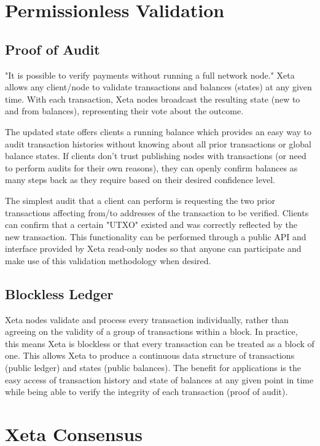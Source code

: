 \documentclass{article}
\begin{document}
\section{Permissionless Validation}
\subsection{Proof of Audit}
"It is possible to verify payments without running a full network node." Xeta allows any client/node to validate transactions and balances (states) at any given time. With each transaction, Xeta nodes broadcast the resulting state (new to and from balances), representing their vote about the outcome.
\bigskip

The updated state offers clients a running balance which provides an easy way to audit transaction histories without knowing about all prior transactions or global balance states. If clients don't trust publishing nodes with transactions (or need to perform audits for their own reasons), they can openly confirm balances as many steps back as they require based on their desired confidence level.
\bigskip

The simplest audit that a client can perform is requesting the two prior transactions affecting from/to addresses of the transaction to be verified. Clients can confirm that a certain "UTXO" existed and was correctly reflected by the new transaction. This functionality can be performed through a public API and interface provided by Xeta read-only nodes so that anyone can participate and make use of this validation methodology when desired.

\subsection{Blockless Ledger}
Xeta nodes validate and process every transaction individually, rather than agreeing on the validity of a group of transactions within a block. In practice, this means Xeta is blockless or that every transaction can be treated as a block of one. This allows Xeta to produce a continuous data structure of transactions (public ledger) and states (public balances). The benefit for applications is the easy access of transaction history and state of balances at any given point in time while being able to verify the integrity of each transaction (proof of audit).

\section{Xeta Consensus}
\end{document}
